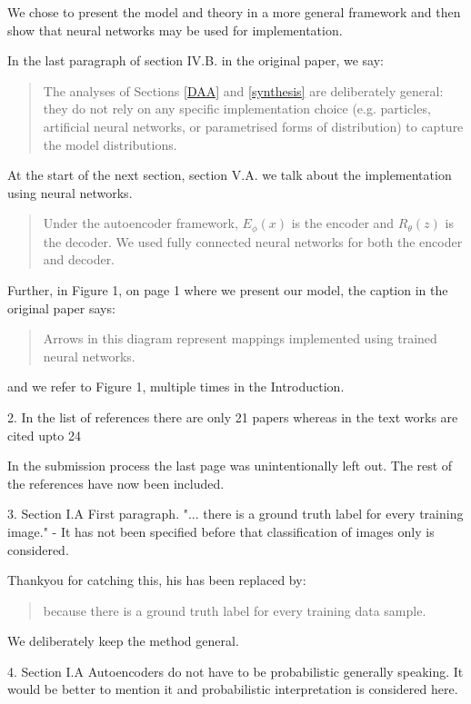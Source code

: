 \documentclass{article}
\begin{document}
We chose to present the model and theory in a more general framework and then show that neural networks may be used for implementation.
    
    In the last paragraph of section IV.B. in the original paper, we say:
    \begin{quote}
    The analyses of Sections \ref{DAA} and \ref{synthesis} are deliberately general: they do not rely on any specific implementation choice (e.g. particles, artificial neural networks, or parametrised forms of distribution) to capture the model distributions.
    \end{quote}
At the start of the next section, section V.A. we talk about the implementation using neural networks.
\begin{quote}
    Under the autoencoder framework, $E_\phi(x)$ is the encoder and $R_\theta(z)$ is the decoder. We used fully connected neural networks for both the encoder and decoder.
\end{quote}

Further, in Figure 1, on page 1 where we present our model, the caption in the original paper says:
\begin{quote}
    Arrows in this diagram represent mappings implemented using trained neural networks.
\end{quote}
and we refer to Figure 1, multiple times in the Introduction.


{\color{blue}
2. In the list of references there are only 21 papers whereas in the text works are cited upto 24} \newline

In the submission process the last page was unintentionally left out. The rest of the references have now been included. \newline

{\color{blue}
3. Section I.A First paragraph. "... there is a ground truth label for every training image." - It has not been specified before that classification of images only is considered.} \newline

Thankyou for catching this, his has been replaced by:
\begin{quote}
    because there is a ground truth label for every training data sample.
\end{quote}
We deliberately keep the method general. \newline

{\color{blue}
4. Section I.A Autoencoders do not have to be probabilistic generally speaking. It would be better to mention it and probabilistic interpretation is considered here.}
\end{document}
